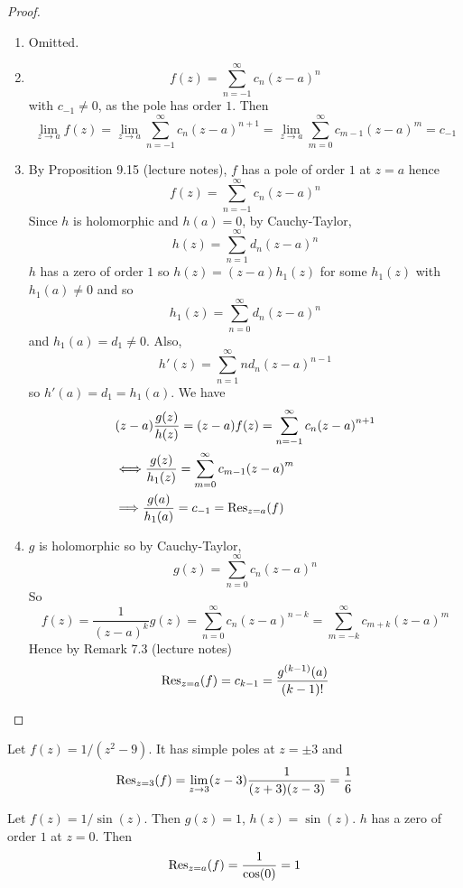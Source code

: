 \begin{proof}
	\hfill
	\begin{enumerate}
		\item Omitted.
		\item \[
			f(z) = \sum_{n = -1}^{\infty} c_n {(z - a)}^n
		\]
		with $c_{-1} \ne 0$, as the pole has order $1$. Then
		\[
			\lim_{z \to a} f(z) = \lim_{z \to a} \sum_{n = -1}^{\infty} c_n {(z - a)}^{n + 1} = \lim_{z \to a} \sum_{m = 0}^{\infty} c_{m - 1} {(z - a)}^m = c_{-1}
		\]
		\item By Proposition 9.15 (lecture notes), $f$ has a pole of order $1$ at $z = a$ hence
		\[
			f(z) = \sum_{n = -1}^{\infty} c_n {(z - a)}^n
		\]
		Since $h$ is holomorphic and $h(a) = 0$, by Cauchy-Taylor,
		\[
			h(z) = \sum_{n = 1}^{\infty} d_n {(z - a)}^n
		\]
		$h$ has a zero of order $1$ so $h(z) = (z - a) h_1(z)$ for some $h_1(z)$ with $h_1(a) \ne 0$ and so
		\[
			h_1(z) = \sum_{n = 0}^{\infty} d_n {(z - a)}^n
		\]
		and $h_1(a) = d_1 \ne 0$. Also,
		\[
			h'(z) = \sum_{n = 1}^{\infty} n d_n {(z - a)}^{n - 1}
		\]
		so $h'(a) = d_1 = h_1(a)$. We have
		\[
			\begin{aligned}
				& (z - a) \frac{g(z)}{h(z)} = (z - a) f(z) = \sum_{n = -1}^{\infty} c_n {(z - a)}^{n + 1} \\
				& \Longleftrightarrow \frac{g(z)}{h_1(z)} = \sum_{m = 0}^{\infty} c_{m - 1} {(z - a)}^m \\
				& \Longrightarrow \frac{g(a)}{h_1(a)} = c_{-1} = \text{Res}_{z = a}(f)
			\end{aligned}
		\]
		\item $g$ is holomorphic so by Cauchy-Taylor,
		\[
			g(z) = \sum_{n = 0}^{\infty} c_n {(z - a)}^n
		\]
		So
		\[
			f(z) = \frac{1}{{(z - a)}^k} g(z) = \sum_{n = 0}^{\infty} c_n {(z - a)}^{n - k} = \sum_{m = -k}^{\infty} c_{m + k} {(z - a)}^m
		\]
		Hence by Remark 7.3 (lecture notes)
		\[
			\text{Res}_{z = a}(f) = c_{k - 1} = \frac{g^{(k - 1)}(a)}{(k - 1)!}
		\]
	\end{enumerate}
\end{proof}

\begin{example}
	Let $f(z) = 1 / (z^2 - 9)$. It has simple poles at $z = \pm 3$ and
	\[
		\text{Res}_{z = 3}(f) = \lim_{z \to 3} (z - 3) \frac{1}{(z + 3)(z - 3)} = \frac{1}{6}
	\]
\end{example}

\begin{example}
	Let $f(z) = 1 / \sin(z)$. Then $g(z) = 1$, $h(z) = \sin(z)$. $h$ has a zero of order $1$ at $z = 0$. Then
	\[
		\text{Res}_{z = a}(f) = \frac{1}{\cos(0)} = 1
	\]
\end{example}

